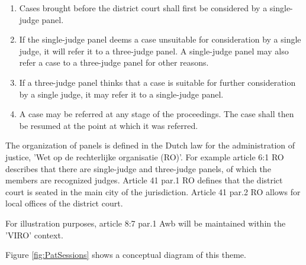 \documentclass[10pt,a4paper]{report}              %
\theoremstyle{plain}\theorembodyfont{\rmfamily}\newtheorem{definition}{Definition}[section]
\theoremstyle{plain}\theorembodyfont{\rmfamily}\newtheorem{designrule}[definition]{Requirement}
\begin{document}
\begin{enumerate}[1.]
\item
  Cases brought before the district court shall first be considered by a
  single-judge panel.
\item
  If the single-judge panel deems a case unsuitable for consideration by
  a single judge, it will refer it to a three-judge panel. A
  single-judge panel may also refer a case to a three-judge panel for
  other reasons.
\item
  If a three-judge panel thinks that a case is suitable for further
  consideration by a single judge, it may refer it to a single-judge
  panel.
\item
  A case may be referred at any stage of the proceedings. The case shall
  then be resumed at the point at which it was referred.
\end{enumerate}
The organization of panels is defined in the Dutch law for the
administration of justice, 'Wet op de rechterlijke organisatie (RO)'.
For example article 6:1 RO describes that there are single-judge and
three-judge panels, of which the members are recognized judges. Article
41 par.1 RO defines that the district court is seated in the main city
of the jurisdiction. Article 41 par.2 RO allows for local offices of the
district court.

For illustration purposes, article 8:7 par.1 Awb will be maintained
within the 'VIRO' context.

Figure \ref{fig:PatSessions} shows a conceptual diagram of this theme.
\end{document}
